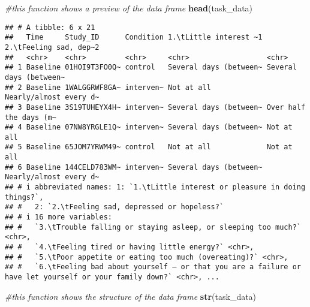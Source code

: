 \documentclass[
]{article}
\newenvironment{Shaded}{\begin{snugshade}}{\end{snugshade}}
\newcommand{\CommentTok}[1]{\textcolor[rgb]{0.56,0.35,0.01}{\textit{#1}}}
\newcommand{\FunctionTok}[1]{\textcolor[rgb]{0.13,0.29,0.53}{\textbf{#1}}}
\newcommand{\NormalTok}[1]{#1}
\begin{document}
\begin{Shaded}
\begin{Highlighting}[]
\CommentTok{\#this function shows a preview of the data frame }
\FunctionTok{head}\NormalTok{(task\_data)}
\end{Highlighting}
\end{Shaded}

\begin{verbatim}
## # A tibble: 6 x 21
##   Time     Study_ID      Condition 1.\tLittle interest ~1 2.\tFeeling sad, dep~2
##   <chr>    <chr>         <chr>     <chr>                  <chr>                 
## 1 Baseline 01HOI9T3FO0Q~ control   Several days (between~ Several days (between~
## 2 Baseline 1WALGGRWF8GA~ interven~ Not at all             Nearly/almost every d~
## 3 Baseline 3S19TUHEYX4H~ interven~ Several days (between~ Over half the days (m~
## 4 Baseline 07NW8YRGLE1Q~ interven~ Several days (between~ Not at all            
## 5 Baseline 65JOM7YRWM49~ control   Not at all             Not at all            
## 6 Baseline 144CELD783WM~ interven~ Several days (between~ Nearly/almost every d~
## # i abbreviated names: 1: `1.\tLittle interest or pleasure in doing things?`,
## #   2: `2.\tFeeling sad, depressed or hopeless?`
## # i 16 more variables:
## #   `3.\tTrouble falling or staying asleep, or sleeping too much?` <chr>,
## #   `4.\tFeeling tired or having little energy?` <chr>,
## #   `5.\tPoor appetite or eating too much (overeating)?` <chr>,
## #   `6.\tFeeling bad about yourself – or that you are a failure or have let yourself or your family down?` <chr>, ...
\end{verbatim}

\begin{Shaded}
\begin{Highlighting}[]
\CommentTok{\#this function shows the structure of the data frame}
\FunctionTok{str}\NormalTok{(task\_data)}
\end{Highlighting}
\end{Shaded}
\end{document}
